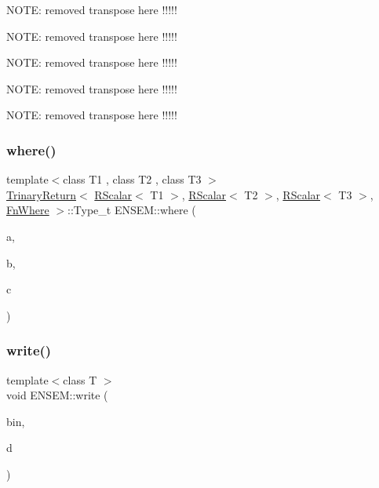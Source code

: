 N\+O\+TE\+: removed transpose here !!!!!

N\+O\+TE\+: removed transpose here !!!!!

N\+O\+TE\+: removed transpose here !!!!!

N\+O\+TE\+: removed transpose here !!!!!

N\+O\+TE\+: removed transpose here !!!!! \mbox{\label{group__rscalar_gab32228a08de8d1e17ba1f7829c1aff56}} 
\subsubsection{\texorpdfstring{where()}{where()}}
{\footnotesize\ttfamily template$<$class T1 , class T2 , class T3 $>$ \\
\mbox{\hyperlink{structENSEM_1_1TrinaryReturn}{Trinary\+Return}}$<$ \mbox{\hyperlink{classENSEM_1_1RScalar}{R\+Scalar}}$<$ T1 $>$, \mbox{\hyperlink{classENSEM_1_1RScalar}{R\+Scalar}}$<$ T2 $>$, \mbox{\hyperlink{classENSEM_1_1RScalar}{R\+Scalar}}$<$ T3 $>$, \mbox{\hyperlink{structENSEM_1_1FnWhere}{Fn\+Where}} $>$\+::Type\+\_\+t E\+N\+S\+E\+M\+::where (\begin{DoxyParamCaption}\item[{const \mbox{\hyperlink{classENSEM_1_1RScalar}{R\+Scalar}}$<$ T1 $>$ \&}]{a,  }\item[{const \mbox{\hyperlink{classENSEM_1_1RScalar}{R\+Scalar}}$<$ T2 $>$ \&}]{b,  }\item[{const \mbox{\hyperlink{classENSEM_1_1RScalar}{R\+Scalar}}$<$ T3 $>$ \&}]{c }\end{DoxyParamCaption})\hspace{0.3cm}{\ttfamily [inline]}}

\mbox{\label{group__rscalar_ga22fa002fd1c18dfe5d521aef45102477}} 
\subsubsection{\texorpdfstring{write()}{write()}}
{\footnotesize\ttfamily template$<$class T $>$ \\
void E\+N\+S\+E\+M\+::write (\begin{DoxyParamCaption}\item[{\mbox{\hyperlink{classADATIO_1_1BinaryWriter}{A\+D\+A\+T\+I\+O\+::\+Binary\+Writer}} \&}]{bin,  }\item[{const \mbox{\hyperlink{classENSEM_1_1RScalar}{R\+Scalar}}$<$ T $>$ \&}]{d }\end{DoxyParamCaption})\hspace{0.3cm}{\ttfamily [inline]}}



